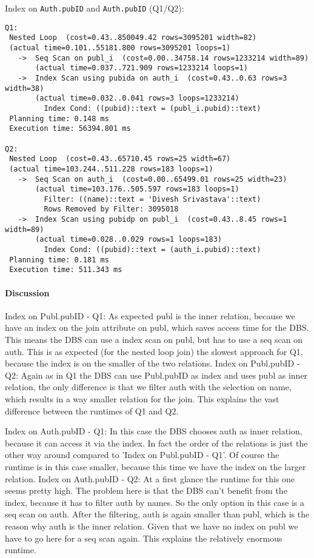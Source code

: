 \documentclass[11pt]{scrartcl}
\begin{document}
\noindent Index on {\tt Auth.pubID} and {\tt Auth.pubID} (Q1/Q2):
{\small
\begin{verbatim}
Q1:
 Nested Loop  (cost=0.43..850049.42 rows=3095201 width=82)
 (actual time=0.101..55181.800 rows=3095201 loops=1)
   ->  Seq Scan on publ_i  (cost=0.00..34758.14 rows=1233214 width=89)
       (actual time=0.037..721.909 rows=1233214 loops=1)
   ->  Index Scan using pubida on auth_i  (cost=0.43..0.63 rows=3 width=38)
       (actual time=0.032..0.041 rows=3 loops=1233214)
         Index Cond: ((pubid)::text = (publ_i.pubid)::text)
 Planning time: 0.148 ms
 Execution time: 56394.801 ms

Q2:
 Nested Loop  (cost=0.43..65710.45 rows=25 width=67)
 (actual time=103.244..511.228 rows=183 loops=1)
   ->  Seq Scan on auth_i  (cost=0.00..65499.01 rows=25 width=23)
       (actual time=103.176..505.597 rows=183 loops=1)
         Filter: ((name)::text = 'Divesh Srivastava'::text)
         Rows Removed by Filter: 3095018
   ->  Index Scan using pubidp on publ_i  (cost=0.43..8.45 rows=1 width=89)
       (actual time=0.028..0.029 rows=1 loops=183)
         Index Cond: ((pubid)::text = (auth_i.pubid)::text)
 Planning time: 0.181 ms
 Execution time: 511.343 ms

\end{verbatim}
}

\paragraph{Discussion}
Index on Publ.pubID - Q1:
As expected publ is the inner relation, because we have an index on the join attribute on publ, which saves access time for the DBS. This means the DBS can use a index scan on publ, but has to use a seq scan on auth.
This is as expected (for the nested loop join) the slowest approach for Q1, because the index is on the smaller of the two relations.
Index on Publ.pubID - Q2:
Again as in Q1 the DBS can use Publ.pubID as index and uses publ as inner relation, the only difference is that we filter auth with the selection on name, which results in a way smaller relation for the join. This explains the vast difference between the runtimes of Q1 and Q2.

Index on Auth.pubID - Q1:
In this case the DBS chooses auth as inner relation, because it can access it via the index. In fact the order of the relations is just the other way around compared to 'Index on Publ.pubID - Q1'. Of course the runtime is in this case smaller, because this time we have the index on the larger relation.
Index on Auth.pubID - Q2:
At a first glance the runtime for this one seems pretty high. The problem here is that the DBS can't benefit from the index, because it has to filter auth by names. So the only option in this case is a seq scan on auth. After the filtering, auth is again smaller than publ, which is the reason why auth is the inner relation. Given that we have no index on publ we have to go here for a seq scan again. This explains the relatively enormous runtime.
\end{document}
